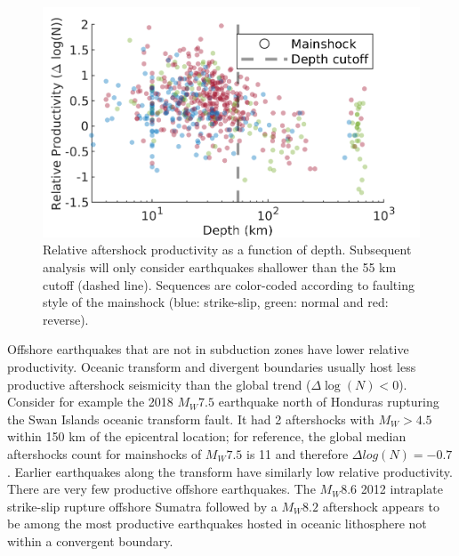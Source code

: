 \documentclass[draft]{agujournal2018}
\begin{document}
    \begin{figure}
        \centering
        \includegraphics{figures/prod_vs_depth.png}
        \caption{Relative aftershock productivity as a function of depth. Subsequent analysis will only consider earthquakes shallower than the 55 km cutoff (dashed line). Sequences are color-coded according to faulting style of the mainshock (blue: strike-slip, green: normal and red: reverse).
        }
        \label{fig:prod_vs_depth}
    \end{figure}
    
    Offshore earthquakes that are not in subduction zones have lower relative productivity. Oceanic transform and divergent boundaries usually host less productive aftershock seismicity than the global trend ($\Delta \log(N)<0$). Consider for example the 2018 $M_W7.5$ earthquake north of Honduras rupturing the Swan Islands oceanic transform fault. It had 2 aftershocks with $M_W>4.5$ within 150 km of the epicentral location; for reference, the global median aftershocks count for mainshocks of $M_W7.5$ is 11 and therefore $\Delta log(N) = -0.7$. Earlier earthquakes along the transform have similarly low relative productivity. There are very few productive offshore earthquakes. The $M_W8.6$ 2012 intraplate strike-slip rupture offshore Sumatra followed by a $M_W8.2$ aftershock appears to be among the most productive earthquakes hosted in oceanic lithosphere not within a convergent boundary.
    
\end{document}
